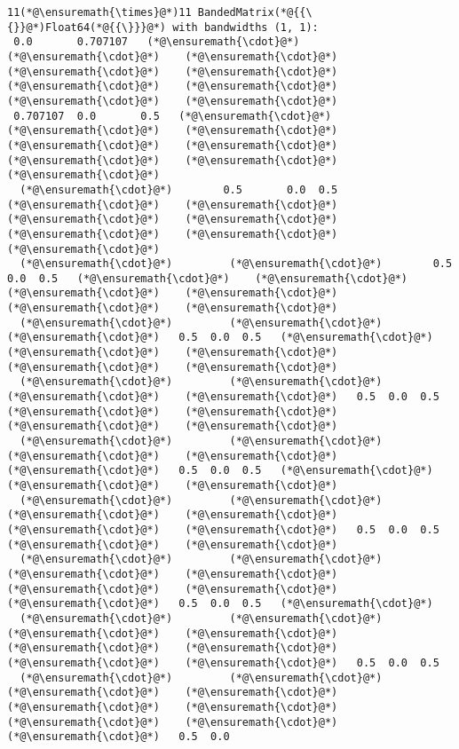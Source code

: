 \documentclass[12pt,landscape]{article}
\begin{document}
{\begin{lstlisting}
11(*@\ensuremath{\times}@*)11 BandedMatrix(*@{{\{}}@*)Float64(*@{{\}}}@*) with bandwidths (1, 1):
 0.0       0.707107   (*@\ensuremath{\cdot}@*)    (*@\ensuremath{\cdot}@*)    (*@\ensuremath{\cdot}@*)    (*@\ensuremath{\cdot}@*)    (*@\ensuremath{\cdot}@*)    (*@\ensuremath{\cdot}@*)    (*@\ensuremath{\cdot}@*)    (*@\ensuremath{\cdot}@*)    (*@\ensuremath{\cdot}@*) 
 0.707107  0.0       0.5   (*@\ensuremath{\cdot}@*)    (*@\ensuremath{\cdot}@*)    (*@\ensuremath{\cdot}@*)    (*@\ensuremath{\cdot}@*)    (*@\ensuremath{\cdot}@*)    (*@\ensuremath{\cdot}@*)    (*@\ensuremath{\cdot}@*)    (*@\ensuremath{\cdot}@*) 
  (*@\ensuremath{\cdot}@*)        0.5       0.0  0.5   (*@\ensuremath{\cdot}@*)    (*@\ensuremath{\cdot}@*)    (*@\ensuremath{\cdot}@*)    (*@\ensuremath{\cdot}@*)    (*@\ensuremath{\cdot}@*)    (*@\ensuremath{\cdot}@*)    (*@\ensuremath{\cdot}@*) 
  (*@\ensuremath{\cdot}@*)         (*@\ensuremath{\cdot}@*)        0.5  0.0  0.5   (*@\ensuremath{\cdot}@*)    (*@\ensuremath{\cdot}@*)    (*@\ensuremath{\cdot}@*)    (*@\ensuremath{\cdot}@*)    (*@\ensuremath{\cdot}@*)    (*@\ensuremath{\cdot}@*) 
  (*@\ensuremath{\cdot}@*)         (*@\ensuremath{\cdot}@*)         (*@\ensuremath{\cdot}@*)   0.5  0.0  0.5   (*@\ensuremath{\cdot}@*)    (*@\ensuremath{\cdot}@*)    (*@\ensuremath{\cdot}@*)    (*@\ensuremath{\cdot}@*)    (*@\ensuremath{\cdot}@*) 
  (*@\ensuremath{\cdot}@*)         (*@\ensuremath{\cdot}@*)         (*@\ensuremath{\cdot}@*)    (*@\ensuremath{\cdot}@*)   0.5  0.0  0.5   (*@\ensuremath{\cdot}@*)    (*@\ensuremath{\cdot}@*)    (*@\ensuremath{\cdot}@*)    (*@\ensuremath{\cdot}@*) 
  (*@\ensuremath{\cdot}@*)         (*@\ensuremath{\cdot}@*)         (*@\ensuremath{\cdot}@*)    (*@\ensuremath{\cdot}@*)    (*@\ensuremath{\cdot}@*)   0.5  0.0  0.5   (*@\ensuremath{\cdot}@*)    (*@\ensuremath{\cdot}@*)    (*@\ensuremath{\cdot}@*) 
  (*@\ensuremath{\cdot}@*)         (*@\ensuremath{\cdot}@*)         (*@\ensuremath{\cdot}@*)    (*@\ensuremath{\cdot}@*)    (*@\ensuremath{\cdot}@*)    (*@\ensuremath{\cdot}@*)   0.5  0.0  0.5   (*@\ensuremath{\cdot}@*)    (*@\ensuremath{\cdot}@*) 
  (*@\ensuremath{\cdot}@*)         (*@\ensuremath{\cdot}@*)         (*@\ensuremath{\cdot}@*)    (*@\ensuremath{\cdot}@*)    (*@\ensuremath{\cdot}@*)    (*@\ensuremath{\cdot}@*)    (*@\ensuremath{\cdot}@*)   0.5  0.0  0.5   (*@\ensuremath{\cdot}@*) 
  (*@\ensuremath{\cdot}@*)         (*@\ensuremath{\cdot}@*)         (*@\ensuremath{\cdot}@*)    (*@\ensuremath{\cdot}@*)    (*@\ensuremath{\cdot}@*)    (*@\ensuremath{\cdot}@*)    (*@\ensuremath{\cdot}@*)    (*@\ensuremath{\cdot}@*)   0.5  0.0  0.5
  (*@\ensuremath{\cdot}@*)         (*@\ensuremath{\cdot}@*)         (*@\ensuremath{\cdot}@*)    (*@\ensuremath{\cdot}@*)    (*@\ensuremath{\cdot}@*)    (*@\ensuremath{\cdot}@*)    (*@\ensuremath{\cdot}@*)    (*@\ensuremath{\cdot}@*)    (*@\ensuremath{\cdot}@*)   0.5  0.0
\end{lstlisting}


}
\end{document}

